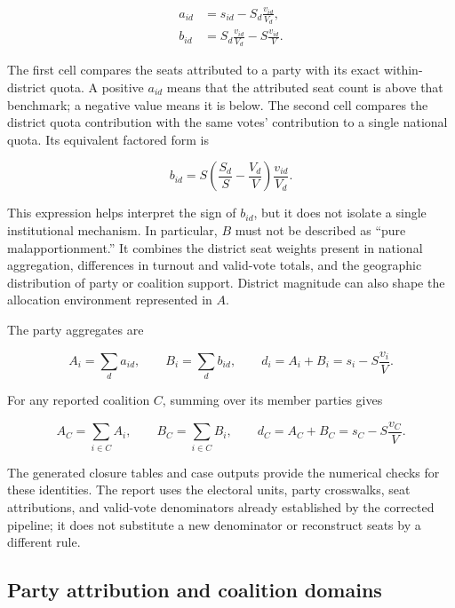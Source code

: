 \documentclass[11pt]{article}
\begin{document}
\begin{align}
a_{id}
  &=s_{id}-S_d\frac{v_{id}}{V_d},\\
b_{id}
  &=S_d\frac{v_{id}}{V_d}-S\frac{v_{id}}{V}.
\end{align}

The first cell compares the seats attributed to a party with its exact
within-district quota. A positive $a_{id}$ means that the attributed seat count
is above that benchmark; a negative value means it is below. The second cell
compares the district quota contribution with the same votes' contribution to
a single national quota. Its equivalent factored form is

\begin{equation}
b_{id}
=S\left(\frac{S_d}{S}-\frac{V_d}{V}\right)
 \frac{v_{id}}{V_d}.
\end{equation}

This expression helps interpret the sign of $b_{id}$, but it does not isolate a
single institutional mechanism. In particular, $B$ must not be described as
``pure malapportionment.'' It combines the district seat weights present in
national aggregation, differences in turnout and valid-vote totals, and the
geographic distribution of party or coalition support. District magnitude can
also shape the allocation environment represented in $A$.

The party aggregates are

\begin{equation}
A_i=\sum_d a_{id},\qquad
B_i=\sum_d b_{id},\qquad
d_i=A_i+B_i=s_i-S\frac{v_i}{V}.
\end{equation}

For any reported coalition $C$, summing over its member parties gives

\begin{equation}
A_C=\sum_{i\in C}A_i,\qquad
B_C=\sum_{i\in C}B_i,\qquad
d_C=A_C+B_C=s_C-S\frac{v_C}{V}.
\end{equation}

The generated closure tables and case outputs provide the numerical checks for
these identities. The report uses the electoral units, party crosswalks, seat
attributions, and valid-vote denominators already established by the corrected
pipeline; it does not substitute a new denominator or reconstruct seats by a
different rule.

\subsection{Party attribution and coalition domains}
\end{document}
